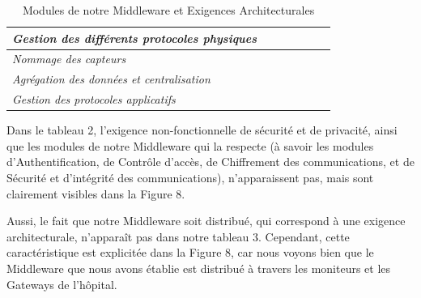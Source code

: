 \begin{table}[h!]
\begin{tabular}{|l|c|c|c|c|c|c|}
		\textit{Gestion des différents protocoles physiques} &                                                                                       & \checkmark                &                                                                            & \checkmark            &                                                                   &                    \\ \hline
		\textit{Nommage des capteurs}                        &                                                                                       & \checkmark                &                                                                            & \checkmark            &                                                                   &                    \\ \hline
		\textit{Agrégation des données et centralisation}    &                                                                                       & \checkmark                &                                                                            & \checkmark            & \checkmark                                                        &                    \\ \hline
		\textit{Gestion des protocoles applicatifs}          &                                                                                       & \checkmark                &                                                                            & \checkmark            &                                                                   &                    \\ \hline
	\end{tabular}
	\caption{Modules de notre Middleware et Exigences Architecturales}
\end{table}

Dans le tableau 2, l'exigence non-fonctionnelle de sécurité et de privacité, ainsi que les modules de notre Middleware qui la respecte (à savoir les modules d'Authentification, de Contrôle d'accès, de Chiffrement des communications, et de Sécurité et d'intégrité des communications), n'apparaissent pas, mais sont clairement visibles dans la Figure 8. 

Aussi, le fait que notre Middleware soit distribué, qui correspond à une exigence architecturale, n'apparaît pas dans notre tableau 3. Cependant, cette caractéristique est explicitée dans la Figure 8, car nous voyons bien que le Middleware que nous avons établie est distribué à travers les moniteurs et les Gateways de l'hôpital.

